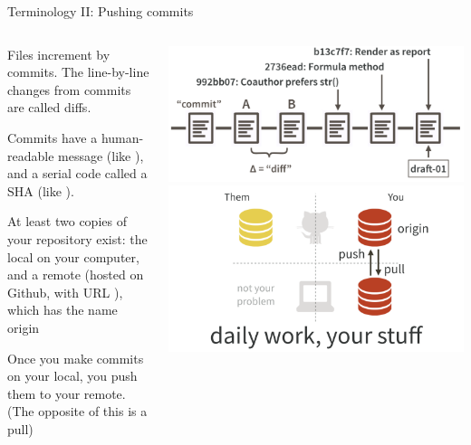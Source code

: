 \documentclass[ignorenonframetext,notes, 10pt, aspectratio=169]{beamer}
\begin{document}
\begin{frame}{Terminology II: Pushing commits}
\begin{columns}
\begin{column}{0.5\textwidth}
\begin{wideitemize}
\item<1-> Files increment by \alert{commit}s. The line-by-line changes from commits are called \alert{diffs}.
\item<2-> Commits have a human-readable \alert{message} (like ), and a serial code called a \alert{SHA} (like ).
\item<3-> At least two copies of your repository exist: the \alert{local} on your computer, and a \alert{remote} (hosted on Github, with URL ), \pause which has the name \alert{origin}
\item<4-> Once you make commits on your local, you \alert{push} them to your remote. (The opposite of this is a \alert{pull})
\end{wideitemize}
\end{column}
\begin{column}{0.5\textwidth}
\includegraphics[width = \linewidth]{commit-diff-sha-tag.png}
\includegraphics[width = \linewidth]{pull-push-yours.png}
\end{column}
\end{columns}
\end{frame}
\end{document}
